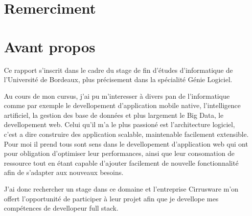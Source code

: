 \section{Remerciment}

\newpage
\section{Avant propos}
Ce rapport s'inscrit dans le cadre du stage de fin d'études d'informatique de l'Université de Bordeaux, plus précisement dans la spécialité Génie Logiciel.

Au cours de mon cursus, j'ai pu m'interesser à divers pan de l'informatique comme par exemple le devellopement d'application mobile native, l'intelligence artificiel, la gestion des base de données et plus largement le Big Data, le devellopement web. Celui qu'il m'a le plus passioné est l'architecture logiciel, c'est a dire construire des application scalable, maintenable facilement extensible. Pour moi il prend tous sont sens dans le devellopement d'application web qui ont pour obligation d'optimiser leur performances, ainsi que leur consomation de ressource tout en étant capable d'ajouter facilement de nouvelle fonctionnalité afin de s'adapter aux nouveaux besoins.

J'ai donc rechercher un stage dans ce domaine et l'entreprise Cirrusware m'on offert l'opportunité de participer à leur projet afin que je devellope mes compétences de devellopeur full stack. 




